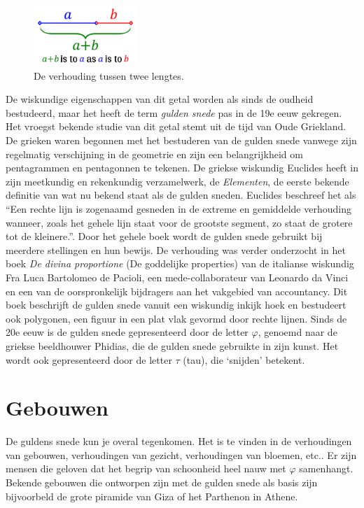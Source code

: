 \documentclass{article}
\begin{document}
\begin{figure}[Hh]
	\centering
	\includegraphics[width=0.35\textwidth]{golden-ratio-line.png}
	\caption{De verhouding tussen twee lengtes.}
	\label{fig:ratio-lines}
\end{figure}

De wiskundige eigenschappen van dit getal worden als sinds de oudheid bestudeerd, maar het heeft de term \textit{gulden snede} pas in de 19e eeuw gekregen. Het vroegst bekende studie van dit getal stemt uit de tijd van Oude Griekland. De grieken waren begonnen met het bestuderen van de gulden snede vanwege zijn regelmatig verschijning in de geometrie en zijn een belangrijkheid om pentagrammen en pentagonnen te tekenen. De griekse wiskundig Euclides heeft in zijn meetkundig en rekenkundig verzamelwerk, de \textit{Elementen}, de eerste bekende definitie van wat nu bekend staat als de gulden sneden. Euclides beschreef het als ``Een rechte lijn is zogenaamd gesneden in de extreme en gemiddelde verhouding wanneer, zoals het gehele lijn staat voor de grootste segment, zo staat de grotere tot de kleinere.''. Door het gehele boek wordt de gulden snede gebruikt bij meerdere stellingen en hun bewijs. De verhouding was verder onderzocht in het boek \textit{De divina proportione} (De goddelijke properties) van de italianse wiskundig Fra Luca Bartolomeo de Pacioli, een mede-collaborateur van Leonardo da Vinci en een van de oorspronkelijk bijdragers aan het vakgebied van accountancy. Dit boek beschrijft de gulden snede vanuit een wiskundig inkijk hoek en bestudeert ook polygonen, een figuur in een plat vlak gevormd door rechte lijnen. Sinds de 20e eeuw is de gulden snede gepresenteerd door de letter \(\varphi\), genoemd naar de griekse beeldhouwer Phidias, die de gulden snede gebruikte in zijn kunst. Het wordt ook gepresenteerd door de letter \(\tau\) (tau), die `snijden' betekent.

\section{Gebouwen}

De guldens snede kun je overal tegenkomen. Het is te vinden in de verhoudingen van gebouwen, verhoudingen van gezicht, verhoudingen van bloemen, etc.. Er zijn mensen die geloven dat het begrip van schoonheid heel nauw met \(\varphi\) samenhangt. Bekende gebouwen die ontworpen zijn met de gulden snede als basis zijn bijvoorbeld de grote piramide van Giza of het Parthenon in Athene. 
\end{document}
